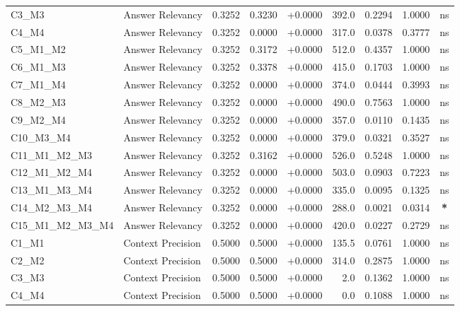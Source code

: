 \begin{table}[p]
\begin{tabular*}{\textwidth}{@{\extracolsep{\fill}} l l r r r r r r c @{}}
\addlinespace
C3\_M3          & Answer Relevancy     & 0.3252 & 0.3230 & +0.0000 & 392.0 & 0.2294 & 1.0000 & ns \\
\addlinespace
C4\_M4          & Answer Relevancy     & 0.3252 & 0.0000 & +0.0000 & 317.0 & 0.0378 & 0.3777 & ns \\
\addlinespace
C5\_M1\_M2      & Answer Relevancy     & 0.3252 & 0.3172 & +0.0000 & 512.0 & 0.4357 & 1.0000 & ns \\
\addlinespace
C6\_M1\_M3      & Answer Relevancy     & 0.3252 & 0.3378 & +0.0000 & 415.0 & 0.1703 & 1.0000 & ns \\
\addlinespace
C7\_M1\_M4      & Answer Relevancy     & 0.3252 & 0.0000 & +0.0000 & 374.0 & 0.0444 & 0.3993 & ns \\
\addlinespace
C8\_M2\_M3      & Answer Relevancy     & 0.3252 & 0.0000 & +0.0000 & 490.0 & 0.7563 & 1.0000 & ns \\
\addlinespace
C9\_M2\_M4      & Answer Relevancy     & 0.3252 & 0.0000 & +0.0000 & 357.0 & 0.0110 & 0.1435 & ns \\
\addlinespace
C10\_M3\_M4     & Answer Relevancy     & 0.3252 & 0.0000 & +0.0000 & 379.0 & 0.0321 & 0.3527 & ns \\
\addlinespace
C11\_M1\_M2\_M3 & Answer Relevancy     & 0.3252 & 0.3162 & +0.0000 & 526.0 & 0.5248 & 1.0000 & ns \\
\addlinespace
C12\_M1\_M2\_M4 & Answer Relevancy     & 0.3252 & 0.0000 & +0.0000 & 503.0 & 0.0903 & 0.7223 & ns \\
\addlinespace
C13\_M1\_M3\_M4 & Answer Relevancy     & 0.3252 & 0.0000 & +0.0000 & 335.0 & 0.0095 & 0.1325 & ns \\
\addlinespace
C14\_M2\_M3\_M4 & Answer Relevancy     & 0.3252 & 0.0000 & +0.0000 & 288.0 & 0.0021 & 0.0314 & \textbf{*} \\
\addlinespace
C15\_M1\_M2\_M3\_M4 & Answer Relevancy     & 0.3252 & 0.0000 & +0.0000 & 420.0 & 0.0227 & 0.2729 & ns \\
\addlinespace
C1\_M1          & Context Precision    & 0.5000 & 0.5000 & +0.0000 & 135.5 & 0.0761 & 1.0000 & ns \\
\addlinespace
C2\_M2          & Context Precision    & 0.5000 & 0.5000 & +0.0000 & 314.0 & 0.2875 & 1.0000 & ns \\
\addlinespace
C3\_M3          & Context Precision    & 0.5000 & 0.5000 & +0.0000 & 2.0 & 0.1362 & 1.0000 & ns \\
\addlinespace
C4\_M4          & Context Precision    & 0.5000 & 0.5000 & +0.0000 & 0.0 & 0.1088 & 1.0000 & ns \\

\end{tabular*}
\end{table}
